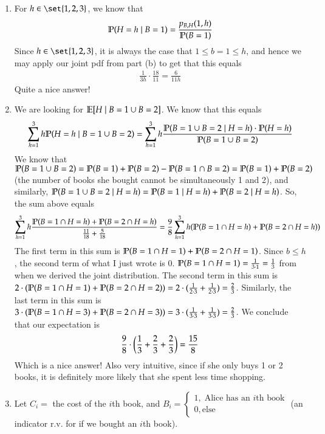 \documentclass[12pt]{article}
\theoremstyle{definitionstyle}
\renewcommand{\P}{\mathbb{P}\qty}
\newcommand{\E}{\mathbb{E}\qty}
\begin{document}
\begin{enumerate}[leftmargin=\labelsep]
\begin{enumerate}
			\item For $h \in \set{1, 2, 3}$, we know that 
			\begin{align*}
				\P(H = h \mid B = 1) = \frac{p_{B, H}(1, h)}{\P(B=1)}
			\end{align*}
			Since $h \in \set{1, 2, 3}$, it is always the case that $1 \leq b = 1 \leq h$, and hence we may apply our joint pdf from part (b) to get that this equals
			\begin{align*}
				\frac{1}{3h} \cdot \frac{18}{11} = \frac{6}{11h}
			\end{align*}
			Quite a nice answer!
			
			\item We are looking for $\E[H \mid B = 1 \cup B = 2]$. We know that this equals
			\begin{align*}
				\sum_{h=1}^3 h \P(H=h \mid B = 1 \cup B = 2) = \sum_{h=1}^3 h \frac{\P(B = 1 \cup B = 2 \mid H = h) \cdot \P(H = h)}{\P(B = 1 \cup B = 2)}
			\end{align*}
			We know that $\P(B = 1 \cup B = 2) = \P(B = 1) + \P(B = 2) - \P(B = 1 \cap B = 2) = \P(B = 1) + \P(B = 2)$ (the number of books she bought cannot be simultaneously 1 and 2), and similarly, $\P(B = 1 \cup B = 2 \mid H = h) = \P(B = 1 \mid H = h) + \P(B = 2 \mid H = h)$. So, the sum above equals
			\begin{align*}
				\sum_{h=1}^3 h \frac{\P(B = 1 \cap H = h) + \P(B = 2 \cap H = h)}{\frac{11}{18} + \frac{5}{18}} = \frac98 \sum_{h=1}^3 h (\P(B = 1 \cap H = h) + \P(B = 2 \cap H = h))
			\end{align*}
			The first term in this sum is $\P(B = 1 \cap H = 1) + \P(B = 2 \cap H = 1)$. Since $b \leq h$, the second term of what I just wrote is 0. $\P(B = 1 \cap H = 1) = \frac{1}{3 \cdot 1} = \frac13$ from when we derived the joint distribution. The second term in this sum is $2 \cdot (\P(B = 1 \cap H = 1) + \P(B = 2 \cap H = 2)) = 2 \cdot (\frac1{2 \cdot 3} + \frac1{2 \cdot 3}) = \frac{2}{3}$. Similarly, the last term in this sum is $3 \cdot (\P(B = 1 \cap H = 3) + \P(B = 2 \cap H = 3)) = 3 \cdot (\frac1{3 \cdot 3} + \frac1{3 \cdot 3}) = \frac{2}{3}$. We conclude that our expectation is
			\begin{align*}
				\frac98 \cdot \qty(\frac13 + \frac23 + \frac23) = \frac{15}{8}
			\end{align*}
			Which is a nice answer! Also very intuitive, since if she only buys 1 or 2 books, it is definitely more likely that she spent less time shopping.
			
			\item Let $C_i = $ the cost of the $i$th book, and $B_i = \begin{cases}
				1, \; \text{Alice has an $i$th book} \\
				0, \text{else}
			\end{cases}$ (an indicator r.v. for if we bought an $i$th book).
		

\end{enumerate}
\end{enumerate}
\end{document}
